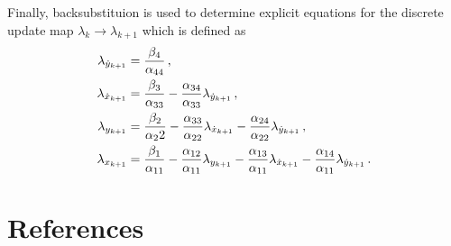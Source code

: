 \documentclass[preprint]{elsarticle}
\begin{document}
Finally, backsubstituion is used to determine explicit equations for the discrete update map \( \lambda_k \to \lambda_{k+1} \) which is defined as
\begin{subequations}\label{eq:costate_update}
\begin{align}
	\lambda_{\dot{y}_{k+1}} &= \frac{\beta_4}{\alpha_{44}} \, ,\\
	\lambda_{\dot{x}_{k+1}} &= \frac{\beta_3}{\alpha_{33}} - \frac{\alpha_{34}}{\alpha_{33}} \lambda_{\dot{y}_{k+1}} \, ,\\
	\lambda_{y_{k+1}} &= \frac{\beta_2}{\alpha_22} - \frac{\alpha_{33}}{\alpha_{22}}\lambda_{\dot{x}_{k+1}} - \frac{\alpha_{24}}{\alpha_{22}} \lambda_{\dot{y}_{k+1}} \, ,\\
	\lambda_{x_{k+1}} &= \frac{\beta_1}{\alpha_{11}} - \frac{\alpha_{12}}{\alpha_{11}} \lambda_{y_{k+1}} - \frac{\alpha_{13}}{\alpha_{11}} \lambda_{\dot{x}_{k+1}} - \frac{\alpha_{14}}{\alpha_{11}} \lambda_{\dot{y}_{k+1}} \, .
\end{align}
\end{subequations}
\section*{References}



\end{document}
